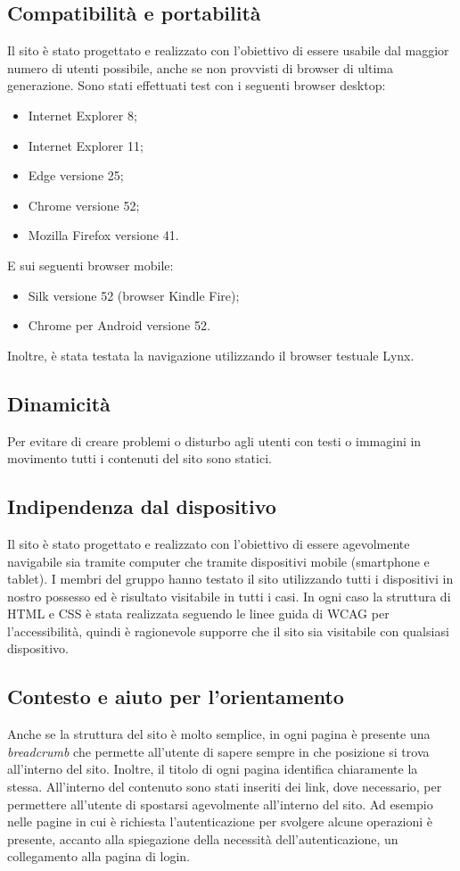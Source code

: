 \subsection{Compatibilità e portabilità}
Il sito è stato progettato e realizzato con l'obiettivo di essere usabile dal maggior numero di utenti possibile, anche se non provvisti di browser di ultima generazione. 
Sono stati effettuati test con i seguenti browser desktop:
\begin{itemize}
	\item Internet Explorer 8;
	\item Internet Explorer 11;
	\item Edge versione 25;
	\item Chrome versione 52;
	\item Mozilla Firefox versione 41.
\end{itemize}
E sui seguenti browser mobile:
\begin{itemize}
	\item Silk versione 52 (browser Kindle Fire);
	\item Chrome per Android versione 52.
\end{itemize}
Inoltre, è stata testata la navigazione utilizzando il browser testuale Lynx.

\subsection{Dinamicità}
Per evitare di creare problemi o disturbo agli utenti con testi o immagini in movimento tutti i contenuti del sito sono statici.

\subsection{Indipendenza dal dispositivo}
Il sito è stato progettato e realizzato con l'obiettivo di essere agevolmente navigabile sia tramite computer che tramite dispositivi mobile (smartphone e tablet).
I membri del gruppo hanno testato il sito utilizzando tutti i dispositivi in nostro possesso ed è risultato visitabile in tutti i casi. \newline
In ogni caso la struttura di HTML e CSS è stata realizzata seguendo le linee guida di WCAG per l'accessibilità, quindi è ragionevole supporre che il sito sia visitabile con qualsiasi dispositivo.

\subsection{Contesto e aiuto per l'orientamento}
Anche se la struttura del sito è molto semplice, in ogni pagina è presente una \textit{breadcrumb} che permette all'utente di sapere sempre in che posizione si trova all'interno del sito. Inoltre, il titolo di ogni pagina identifica chiaramente la stessa. \newline
All'interno del contenuto sono stati inseriti dei link, dove necessario, per permettere all'utente di spostarsi agevolmente all'interno del sito. Ad esempio nelle pagine in cui è richiesta l'autenticazione per svolgere alcune operazioni è presente, accanto alla spiegazione della necessità dell'autenticazione, un collegamento alla pagina di login.

